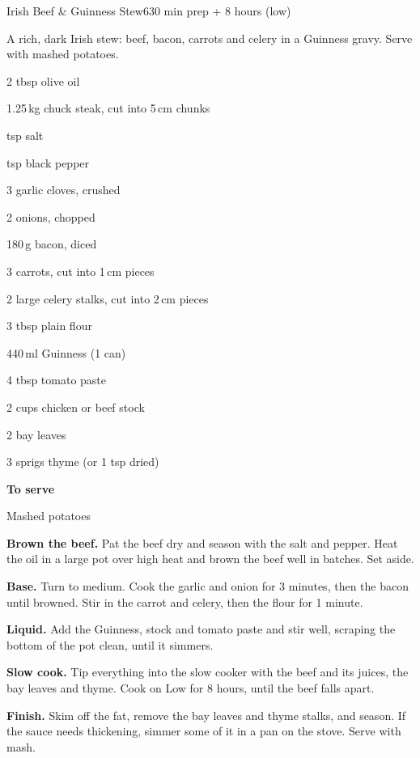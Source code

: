 \begin{recipebox}{Irish Beef \& Guinness Stew}{6}{30 min prep + 8 hours (low)}

A rich, dark Irish stew: beef, bacon, carrots and celery in a Guinness gravy.
Serve with mashed potatoes.

\begin{ingredients}
  \item 2 tbsp olive oil
  \item 1.25\,kg chuck steak, cut into 5\,cm chunks
  \item {} tsp salt
  \item {} tsp black pepper
  \item 3 garlic cloves, crushed
  \item 2 onions, chopped
  \item 180\,g bacon, diced
  \item 3 carrots, cut into 1\,cm pieces
  \item 2 large celery stalks, cut into 2\,cm pieces
  \item 3 tbsp plain flour
  \item 440\,ml Guinness (1 can)
  \item 4 tbsp tomato paste
  \item 2 cups chicken or beef stock
  \item 2 bay leaves
  \item 3 sprigs thyme (or 1 tsp dried)
  \item[] \textbf{To serve}
  \item Mashed potatoes
\end{ingredients}

\begin{method}
  \item \textbf{Brown the beef.} Pat the beef dry and season with the salt and pepper.
        Heat the oil in a large pot over high heat and brown the beef well in
        batches. Set aside.
  \item \textbf{Base.} Turn to medium. Cook the garlic and onion for 3 minutes, then
        the bacon until browned. Stir in the carrot and celery, then the flour for 1
        minute.
  \item \textbf{Liquid.} Add the Guinness, stock and tomato paste and stir well,
        scraping the bottom of the pot clean, until it simmers.
  \item \textbf{Slow cook.} Tip everything into the slow cooker with the beef and its
        juices, the bay leaves and thyme. Cook on Low for 8 hours, until the beef
        falls apart.
  \item \textbf{Finish.} Skim off the fat, remove the bay leaves and thyme stalks, and
        season. If the sauce needs thickening, simmer some of it in a pan on the
        stove. Serve with mash.
\end{method}


\end{recipebox}
